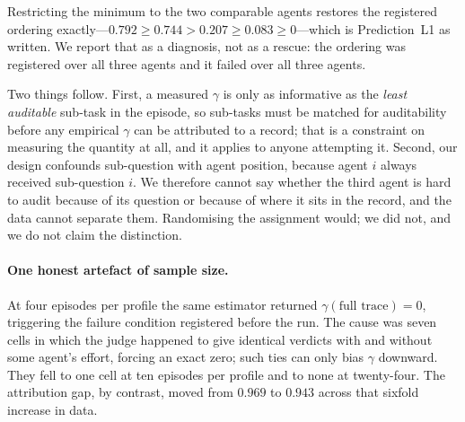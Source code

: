 Restricting the minimum to the two comparable agents restores the registered
ordering exactly---$0.792 \ge 0.744 > 0.207 \ge 0.083 \ge 0$---which is
Prediction~L1 as written. We report that as a diagnosis, not as a rescue: the
ordering was registered over all three agents and it failed over all three
agents.

Two things follow. First, a measured $\gamma$ is only as informative as the
\emph{least auditable} sub-task in the episode, so sub-tasks must be matched for
auditability before any empirical $\gamma$ can be attributed to a record; that is
a constraint on measuring the quantity at all, and it applies to anyone
attempting it. Second, our design confounds sub-question with agent position,
because agent $i$ always received sub-question $i$. We therefore cannot say
whether the third agent is hard to audit because of its question or because of
where it sits in the record, and the data cannot separate them. Randomising the
assignment would; we did not, and we do not claim the distinction.

\paragraph{One honest artefact of sample size.}
At four episodes per profile the same estimator returned
$\gamma(\text{full trace}) = 0$, triggering the failure condition registered
before the run. The cause was seven cells in which the judge happened to give
identical verdicts with and without some agent's effort, forcing an exact zero;
such ties can only bias $\gamma$ downward. They fell to one cell at ten episodes
per profile and to none at twenty-four. The attribution gap, by contrast, moved
from $0.969$ to $0.943$ across that sixfold increase in data.
